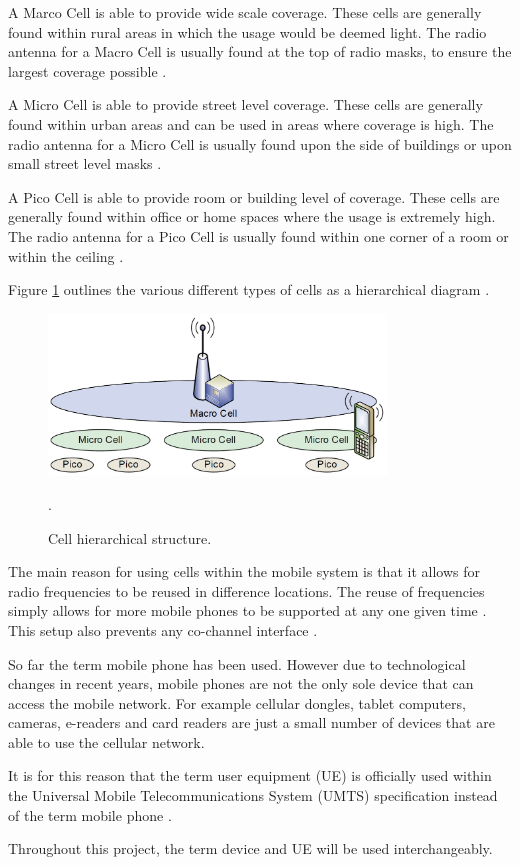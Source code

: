 A Marco Cell is able to provide wide scale coverage. These cells are generally 
found within rural areas in which the usage would be deemed light. The radio 
antenna for a Macro Cell is usually found at the top of radio masks, to ensure 
the largest coverage possible \citep{mpirical10}.

A Micro Cell is able to provide street level coverage. These cells are 
generally found within urban areas and can be used in areas where coverage is 
high. The radio antenna for a Micro Cell is usually found upon the side of 
buildings or upon small street level masks \citep{mpirical10}.

A Pico Cell is able to provide room or building level of coverage. These cells 
are generally found within office or home spaces where the usage is extremely 
high. The radio antenna for a Pico Cell is usually found within one corner of 
a room or within the ceiling \citep{mpirical10}.

Figure \ref{fig:cellHierarchy} outlines the various different types of cells as 
a hierarchical diagram \citep{mpirical10}.

\begin{figure}[H]
  \centering
    \includegraphics[width=0.80\textwidth]{chapter3/mobile_networks/network_hierarchy.png}
  \caption{Cell hierarchical structure.}.
  \label{fig:cellHierarchy}
\end{figure}

The main reason for using cells within the mobile system is that it allows for 
radio frequencies to be reused in difference locations. The reuse of frequencies 
simply allows for more mobile phones to be supported at any one given time 
\citep{cox08}. This setup also prevents any co-channel interface 
\citep{mpirical10}.

So far the term mobile phone has been used. However due to technological 
changes in recent years, mobile phones are not the only sole device that can 
access the mobile network. For example cellular dongles, tablet computers, 
cameras, e-readers and card readers are just a small number of devices that are 
able to use the cellular network. 

It is for this reason that the term user equipment (UE) is officially used 
within the Universal Mobile Telecommunications System (UMTS) specification 
instead of the term mobile phone \citep{cox08,mpirical10}. 

Throughout this project, the term device and UE will be used interchangeably. 
